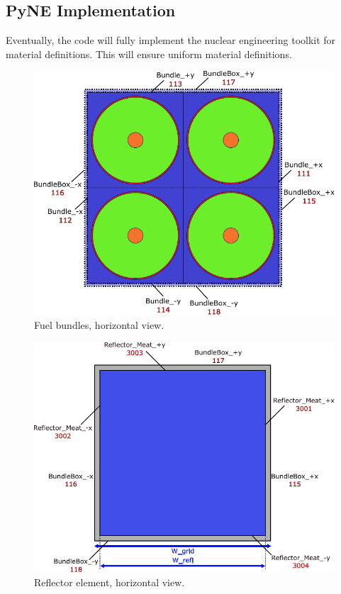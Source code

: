 \documentclass{UWNR_modeling}
\begin{document}
\subsection{PyNE Implementation}

Eventually, the code will fully implement the nuclear engineering toolkit for material definitions. This will ensure uniform material definitions.




\setlength{\baselineskip}{12pt}




\newpage
\appendix
\begin{figure}[H]
  \centering
  \includegraphics[width=5in]{bundle_xy.pdf}
  \caption{Fuel bundles, horizontal view.}
  \label{fig:bundle_xy}
\end{figure}
\begin{figure}[H]
  \centering
  \includegraphics[width=5in]{Refl_xy.pdf}
  \caption{Reflector element, horizontal view.}
  \label{fig:Refl_xy}
\end{figure}
\end{document}
